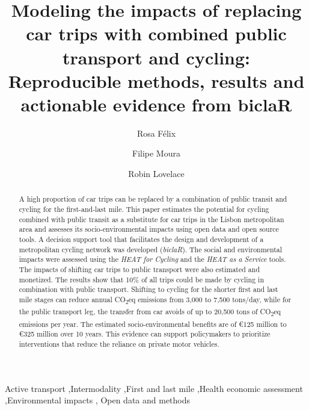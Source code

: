 \documentclass[review, doubleblind, 3p,
authoryear]{elsarticle} %
\begin{document}
\begin{frontmatter}

  \title{Modeling the impacts of replacing car trips with combined
public transport and cycling: Reproducible methods, results and
actionable evidence from biclaR}
    \author[CERIS]{Rosa Félix%
  }
    \author[CERIS]{Filipe Moura%
  }
    \author[ITS]{Robin Lovelace%
  }
  
  \begin{abstract}
  A high proportion of car trips can be replaced by a combination of
  public transit and cycling for the first-and-last mile. This paper
  estimates the potential for cycling combined with public transit as a
  substitute for car trips in the Lisbon metropolitan area and assesses
  its socio-environmental impacts using open data and open source tools.
  A decision support tool that facilitates the design and development of
  a metropolitan cycling network was developed (\emph{biclaR}). The
  social and environmental impacts were assessed using the \emph{HEAT
  for Cycling} and the \emph{HEAT as a Service} tools. The impacts of
  shifting car trips to public transport were also estimated and
  monetized. The results show that 10\% of all trips could be made by
  cycling in combination with public transport. Shifting to cycling for
  the shorter first and last mile stages can reduce annual
  CO\textsubscript{2}eq emissions from 3,000 to 7,500 tons/day, while
  for the public transport leg, the transfer from car avoids of up to
  20,500 tons of CO\textsubscript{2}eq emissions per year. The estimated
  socio-environmental benefits are of €125 million to €325 million over
  10 years. This evidence can support policymakers to prioritize
  interventions that reduce the reliance on private motor vehicles.\\
  \end{abstract}
    \begin{keyword}
    Active transport \sep Intermodality \sep First and last
mile \sep Health economic assessment \sep Environmental impacts \sep 
    Open data and methods
  \end{keyword}
  
 \end{frontmatter}
\end{document}
